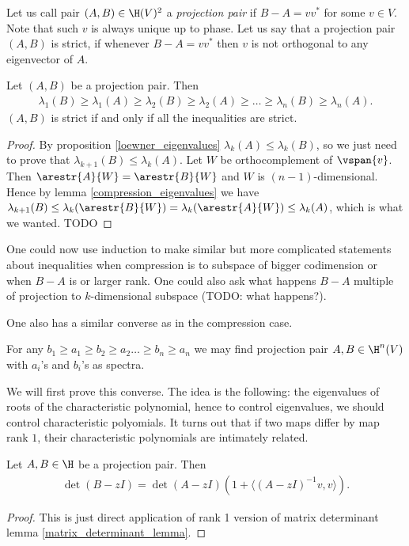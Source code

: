 Let us call pair $(A, B) \in \H(V)^{2}$ a \textit{projection pair} if $B - A = v v^{*}$ for some $v \in V$. Note that such $v$ is always unique up to phase. Let us say that a projection pair $(A, B)$ is strict, if whenever $B - A = v v^{*}$ then $v$ is not orthogonal to any eigenvector of $A$. 

\begin{kor}\label{projection_eigenvalues}
	Let $(A, B)$ be a projection pair. Then
	\begin{align*}
		\lambda_{1}(B) \geq \lambda_{1}(A) \geq \lambda_{2}(B) \geq \lambda_{2}(A) \geq \ldots \geq \lambda_{n}(B) \geq \lambda_{n}(A).
	\end{align*}
	$(A, B)$ is strict if and only if all the inequalities are strict. 
\end{kor}

\begin{proof}
	By proposition \ref{loewner_eigenvalues} $\lambda_{k}(A) \leq \lambda_{k}(B)$, so we just need to prove that $\lambda_{k + 1}(B) \leq \lambda_{k}(A)$. Let $W$ be orthocomplement of $\vspan\{v\}$. Then $\arestr{A}{W} = \arestr{B}{W}$ and $W$ is $(n - 1)$-dimensional. Hence by lemma \ref{compression_eigenvalues} we have $\lambda_{k + 1}(B) \leq \lambda_{k}(\arestr{B}{W}) = \lambda_{k}(\arestr{A}{W}) \leq \lambda_{k}(A)$, which is what we wanted. TODO
\end{proof}

One could now use induction to make similar but more complicated statements about inequalities when compression is to subspace of bigger codimension or when $B - A$ is or larger rank. One could also ask what happens $B - A$ multiple of projection to $k$-dimensional subspace (TODO: what happens?).

One also has a similar converse as in the compression case.

\begin{prop}\label{projection_eigenvalues_con}
	For any $b_{1} \geq a_{1} \geq b_{2} \geq a_{2} \ldots \geq b_{n} \geq a_{n}$ we may find projection pair $A, B \in \H^{n}(V)$ with $a_{i}$'s and $b_{i}$'s as spectra.
\end{prop}

We will first prove this converse. The idea is the following: the eigenvalues of roots of the characteristic polynomial, hence to control eigenvalues, we should control characteristic polyomials. It turns out that if two maps differ by map rank $1$, their characteristic polynomials are intimately related.

\begin{lem}\label{projection_characteristic_polynomial}
	Let $A, B \in \H$ be a projection pair. Then
	\begin{align*}
		\det(B - z I) = \det(A - z I) \left(1 + \langle (A - z I)^{-1}v, v\rangle\right).
	\end{align*}
\end{lem}
\begin{proof}
	This is just direct application of rank 1 version of matrix determinant lemma \ref{matrix_determinant_lemma}.
\end{proof}

